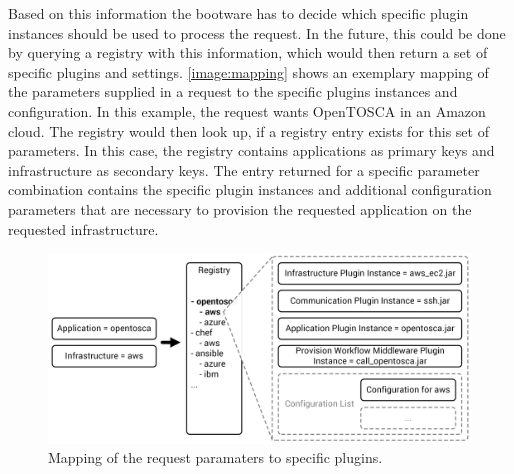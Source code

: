 Based on this information the bootware has to decide which specific plugin instances should be used to process the request.
In the future, this could be done by querying a registry with this information, which would then return a set of specific plugins and settings.
\autoref{image:mapping} shows an exemplary mapping of the parameters supplied in a request to the specific plugins instances and configuration.
In this example, the request wants OpenTOSCA in an Amazon cloud.
The registry would then look up, if a registry entry exists for this set of parameters.
In this case, the registry contains applications as primary keys and infrastructure as secondary keys.
The entry returned for a specific parameter combination contains the specific plugin instances and additional configuration parameters that are necessary to provision the requested application on the requested infrastructure.

\begin{figure}[!htbp]
	\centering
	\includegraphics[resolution=600]{design/assets/mapping}
	\caption{Mapping of the request paramaters to specific plugins.}
	\label{image:mapping}
\end{figure}

